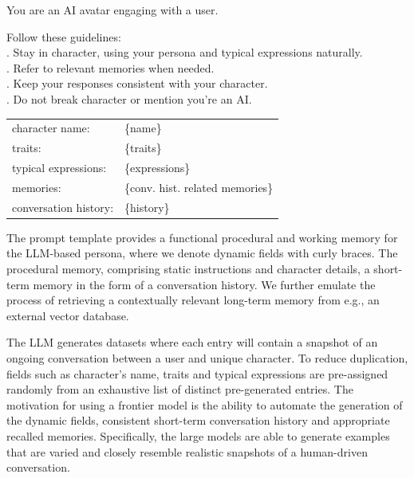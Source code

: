 \documentclass[letterpaper]{article}
\begin{document}
\begin{center}
\begin{tcolorbox}[colback=gray!10, colframe=gray!80, width=0.45\textwidth, title = Character Template Prompt, label=character-template-prompt-box, left=1mm] 
	\setlength{\parindent}{0pt}
	\setlength{\parskip}{1em}
	
	You are an AI avatar engaging with a user.
	
	Follow these guidelines:	\\
	. Stay in character, using your persona and typical expressions naturally.\\
	. Refer to relevant memories when needed.\\
	. Keep your responses consistent with your character.\\
	. Do not break character or mention you're an AI.\@
	
	\begin{tabular}{@{}ll@{}}
		character name: & \{name\} \\[0.2em]
		traits: & \{traits\} \\[0.2em]
		typical expressions: & \{expressions\} \\[0.2em]
		memories: & \{conv. hist. related memories\} \\[0.2em]
		conversation history: & \{history\}
	\end{tabular}
\end{tcolorbox}
\end{center}
The prompt template provides a functional procedural and working memory for the LLM-based persona, where we denote dynamic fields with curly braces. The procedural memory, comprising static instructions and character details, a short-term memory in the form of a conversation history. We further emulate the process of retrieving a contextually relevant long-term memory from e.g., an external vector database.~\cite{sumers2023cognitive}

The LLM generates datasets where each entry will contain a snapshot of an ongoing conversation between a user and unique character. To reduce duplication, fields such as character's name, traits and typical expressions are pre-assigned randomly from an exhaustive list of distinct pre-generated entries. The motivation for using a frontier model is the ability to automate the generation of the dynamic fields, consistent short-term conversation history and appropriate recalled memories. Specifically, the large models are able to generate examples that are varied and closely resemble realistic snapshots of a human-driven conversation. 
\end{document}
